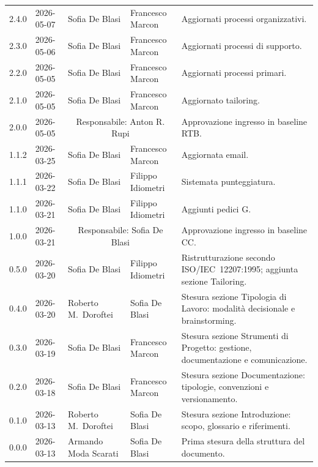 \begin{longtable}{>{\ttfamily\small}l l l l p{4cm}}
  2.4.0 & 2026-05-07 & Sofia De Blasi & Francesco Marcon & Aggiornati processi organizzativi. \\[4pt]
  2.3.0 & 2026-05-06 & Sofia De Blasi & Francesco Marcon & Aggiornati processi di supporto. \\[4pt]
  2.2.0 & 2026-05-05 & Sofia De Blasi & Francesco Marcon & Aggiornati processi primari. \\[4pt]
  2.1.0 & 2026-05-05 & Sofia De Blasi & Francesco Marcon & Aggiornato tailoring. \\[4pt]
  2.0.0 & 2026-05-05 & \multicolumn{2}{c}{Responsabile: Anton R. Rupi} & Approvazione ingresso in baseline RTB. \\[4pt]
  1.1.2 & 2026-03-25 & Sofia De Blasi & Francesco Marcon & Aggiornata email. \\[4pt]
  1.1.1 & 2026-03-22 & Sofia De Blasi & Filippo Idiometri & Sistemata punteggiatura. \\[4pt]
  1.1.0 & 2026-03-21 & Sofia De Blasi & Filippo Idiometri & Aggiunti pedici G. \\[4pt]
  1.0.0 & 2026-03-21 & \multicolumn{2}{c}{Responsabile: Sofia De Blasi} & Approvazione ingresso in baseline CC. \\[4pt]
  0.5.0 & 2026-03-20 & Sofia De Blasi       & Filippo Idiometri & Ristrutturazione secondo ISO/IEC~12207:1995; aggiunta sezione Tailoring. \\[4pt]
  0.4.0 & 2026-03-20 & Roberto M.\ Doroftei & Sofia De Blasi & Stesura sezione Tipologia di Lavoro: modalità decisionale e brainstorming. \\[4pt]
  0.3.0 & 2026-03-19 & Sofia De Blasi       & Francesco Marcon & Stesura sezione Strumenti di Progetto: gestione, documentazione e comunicazione. \\[4pt]
  0.2.0 & 2026-03-18 & Sofia De Blasi       & Francesco Marcon & Stesura sezione Documentazione: tipologie, convenzioni e versionamento. \\[4pt]
  0.1.0 & 2026-03-13 & Roberto M.\ Doroftei & Sofia De Blasi & Stesura sezione Introduzione: scopo, glossario e riferimenti. \\[4pt]
  0.0.0 & 2026-03-13 & Armando Moda Scarati & Sofia De Blasi & Prima stesura della struttura del documento. \\
  \bottomrule
\end{longtable}
